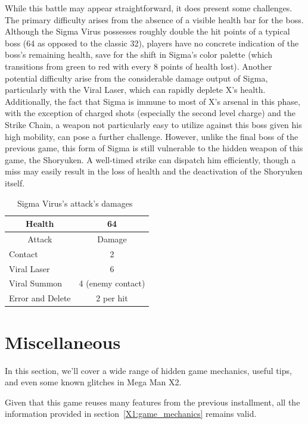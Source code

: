 While this battle may appear straightforward, it does present some challenges. The primary difficulty arises from the absence of a visible health bar for the boss. Although the Sigma Virus possesses roughly double the hit points of a typical boss (64 as opposed to the classic 32), players have no concrete indication of the boss's remaining health, save for the shift in Sigma's color palette (which transitions from green to red with every 8 points of health lost). Another potential difficulty arise from the considerable damage output of Sigma, particularly with the Viral Laser, which can rapidly deplete X's health. Additionally, the fact that Sigma is immune to most of X's arsenal in this phase, with the exception of charged shots (especially the second level charge) and the Strike Chain, a weapon not particularly easy to utilize against this boss given his high mobility, can pose a further challenge. However, unlike the final boss of the previous game, this form of Sigma is still vulnerable to the hidden weapon of this game, the Shoryuken. A well-timed strike can dispatch him efficiently, though a miss may easily result in the loss of health and the deactivation of the Shoryuken itself.

\begin{table}[htp]
	\centering
	\begin{tabular}[h]{l c}
		\toprule
		\multicolumn{1}{c}{Health}  & 64\\
		\midrule
		\multicolumn{1}{c}{Attack} & \multicolumn{1}{c}{Damage}\\
		Contact & 2 \\
		Viral Laser & 6\\
		Viral Summon & 4 (enemy contact)\\
		Error and Delete & 2 per hit\\
		\bottomrule
	\end{tabular}
	\caption{Sigma Virus's attack's damages~\cite{wiki:Neo_sigma}}
\end{table}

\chapter{Miscellaneous}\label{X2:misc} %
In this section, we'll cover a wide range of hidden game mechanics, useful tips, and even some known glitches in Mega Man X2.

Given that this game reuses many features from the previous installment, all the information provided in section~\ref{X1:game_mechanics} remains valid.

